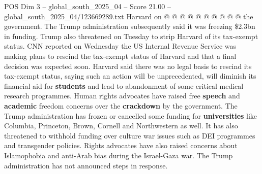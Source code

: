\begin{textsample}{POS Dim 3 – global\_south\_2025\_04 – Score 21.00 – global\_south\_2025\_04/123669289.txt}
Harvard on @ @ @ @ @ @ @ @ @ @ the government.
The Trump administration subsequently said it was freezing \$2.3bn in funding.
Trump also threatened on Tuesday to strip Harvard of its tax-exempt status.
CNN reported on Wednesday the US Internal Revenue Service was making plans to rescind the tax-exempt status of Harvard and that a final decision was expected soon.
Harvard said there was no legal basis to rescind its tax-exempt status, saying such an action will be unprecedented, will diminish its financial aid for \textbf{students} and lead to abandonment of some critical medical research programmes.
Human rights advocates have raised free \textbf{speech} and \textbf{academic} freedom concerns over the \textbf{crackdown} by the government.
The Trump administration has frozen or cancelled some funding for \textbf{universities} like Columbia, Princeton, Brown, Cornell and Northwestern as well.
It has also threatened to withhold funding over culture war issues such as DEI programmes and transgender policies.
Rights advocates have also raised concerns about Islamophobia and anti-Arab bias during the Israel-Gaza war.
The Trump administration has not announced steps in response.

\end{textsample}
